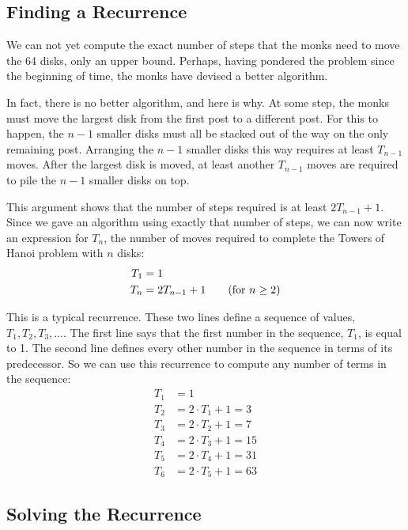 \subsection{Finding a Recurrence}

We can not yet compute the exact number of steps that the monks need
to move the 64 disks, only an upper bound. Perhaps, having pondered
the problem since the beginning of time, the monks have devised a
better algorithm.

In fact, there is no better algorithm, and here is why. At some step,
the monks must move the largest disk from the first post to a
different post. For this to happen, the $n - 1$ smaller disks must all
be stacked out of the way on the only remaining post. Arranging the $n
- 1$ smaller disks this way requires at least $T_{n-1}$ moves. After
the largest disk is moved, at least another $T_{n-1}$ moves are
required to pile the $n - 1$ smaller disks on top.

This argument shows that the number of steps required is at least
$2T_{n-1} + 1$.  Since we gave an algorithm using exactly that number
of steps, we can now write an expression for $T_n$, the number of
moves required to complete the Towers of Hanoi problem with $n$ disks:
\begin{align*}
T_1 & = 1 \\
T_n & = 2T_{n-1} + 1 \text{\qquad (for $n \geq 2$)}
\end{align*}

This is a typical recurrence.  These two lines define a sequence of
values, $T_1, T_2, T_3, \ldots$.  The first line says that the first
number in the sequence, $T_1$, is equal to 1.  The second line defines
every other number in the sequence in terms of its predecessor.  So we
can use this recurrence to compute any number of terms in the sequence:
\begin{align*}
T_1 & = 1 \\
T_2 & = 2 \cdot T_1 + 1 = 3 \\
T_3 & = 2 \cdot T_2 + 1 = 7 \\
T_4 & = 2 \cdot T_3 + 1 = 15 \\
T_5 & = 2 \cdot T_4 + 1 = 31 \\
T_6 & = 2 \cdot T_5 + 1 = 63
\end{align*}

\subsection{Solving the Recurrence}

